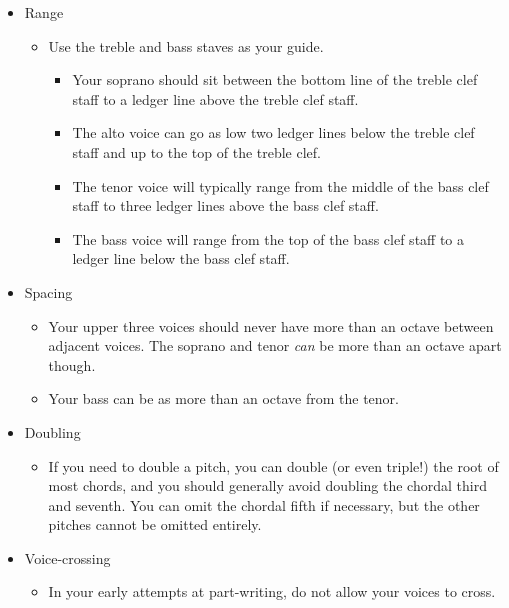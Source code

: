 \documentclass{book}
\providecommand{\tightlist}{%
  \setlength{\itemsep}{0pt}\setlength{\parskip}{0pt}}
\begin{document}
\begin{itemize}
\tightlist
\item
  Range

  \begin{itemize}
  \tightlist
  \item
    Use the treble and bass staves as your guide.

    \begin{itemize}
    \tightlist
    \item
      Your soprano should sit between the bottom line of the treble clef staff
      to a ledger line above the treble clef staff.
    \item
      The alto voice can go as low two ledger lines below the treble clef
      staff and up to the top of the treble clef.
    \item
      The tenor voice will typically range from the middle of the bass clef
      staff to three ledger lines above the bass clef staff.
    \item
      The bass voice will range from the top of the bass clef staff to a
      ledger line below the bass clef staff.
    \end{itemize}
  \end{itemize}
\item
  Spacing

  \begin{itemize}
  \tightlist
  \item
    Your upper three voices should never have more than an octave between
    adjacent voices. The soprano and tenor \emph{can} be more than an octave
    apart though.
  \item
    Your bass can be as more than an octave from the tenor.
  \end{itemize}
\item
  Doubling

  \begin{itemize}
  \tightlist
  \item
    If you need to double a pitch, you can double (or even triple!) the root
    of most chords, and you should generally avoid doubling the chordal third
    and seventh. You can omit the chordal fifth if necessary, but the other
    pitches cannot be omitted entirely.
  \end{itemize}
\item
  Voice-crossing

  \begin{itemize}
  \tightlist
  \item
    In your early attempts at part-writing, do not allow your voices to cross.
  \end{itemize}
\end{itemize}
\end{document}
